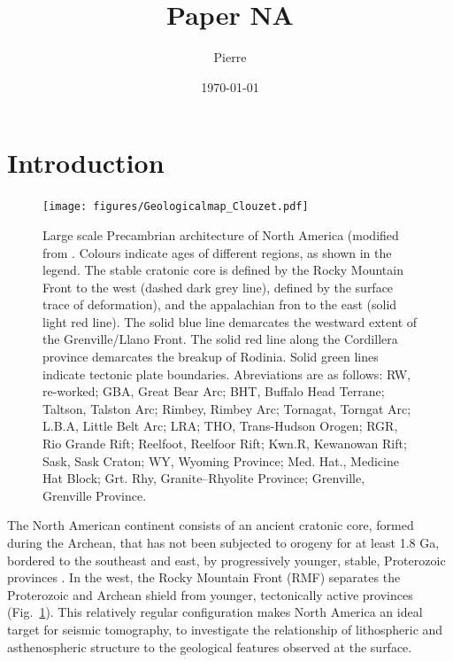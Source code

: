 \documentclass[12pt]{article}
\author{Pierre}
\title{Paper NA}
\date{\today}
\begin{document}
\maketitle

\section{Introduction}

\begin{figure}[p]
	\centering
	\centerline{\texttt{[image: figures/Geologicalmap\_Clouzet.pdf]}}


	\caption{\baselineskip 18pt
	Large scale Precambrian architecture of North America (modified from \cite{whitmeyer2007tectonic}. Colours indicate ages of different regions, as shown in the legend. The stable cratonic core is defined by the Rocky Mountain Front to the west (dashed dark grey line), defined by the surface trace of deformation), and the appalachian fron to the east (solid light red line). The solid blue line demarcates the westward extent of the Grenville/Llano Front. The solid red line along the Cordillera province demarcates the breakup of Rodinia. Solid green lines indicate tectonic plate boundaries. Abreviations are as follows: RW, re-worked; GBA, Great Bear Arc; BHT, Buffalo Head Terrane; Taltson, Talston Arc; Rimbey, Rimbey Arc; Tornagat, Torngat Arc; L.B.A, Little Belt Arc; LRA; THO, Trans-Hudson Orogen; RGR, Rio Grande Rift; Reelfoot, Reelfoor Rift; Kwn.R, Kewanowan Rift; Sask, Sask Craton; WY, Wyoming Province; Med. Hat., Medicine Hat Block; Grt. Rhy, Granite–Rhyolite Province; Grenville, Grenville Province.
	}

	\label{mapgeol}

\end{figure}

The North American continent consists of an ancient cratonic core, formed during the Archean, that has not been subjected to orogeny for at least 1.8 Ga, bordered to the southeast and east, by progressively younger, stable, Proterozoic provinces \citep{hoffman1988united}. In the west, the Rocky Mountain Front (RMF) separates the Proterozoic and Archean shield from younger, tectonically active provinces (Fig.~\ref{mapgeol}). This relatively regular configuration makes North America an ideal target for seismic tomography, to investigate the relationship of lithospheric and asthenospheric structure to the geological features observed at the surface. 
\end{document}
